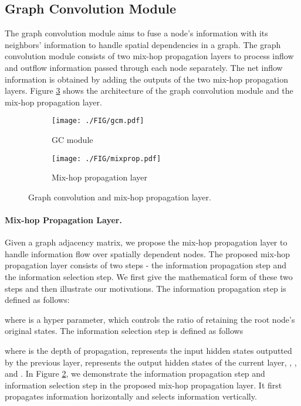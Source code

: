 \documentclass[sigconf]{acmart}
\begin{document}
\subsection{Graph Convolution Module}
The graph convolution module aims to fuse a node's information with its neighbors' information to handle spatial dependencies in a graph. The graph convolution module consists of two mix-hop propagation layers to process inflow and outflow information passed through each node separately. The net inflow information is obtained by adding the outputs of the two mix-hop propagation layers.  Figure \ref{fig:gc} shows the architecture of the graph convolution module and the mix-hop propagation layer. 
 \begin{figure}
        \centering
        \begin{subfigure}[b]{0.23\textwidth}
            \centering
            \texttt{[image: ./FIG/gcm.pdf]}
            \caption[GC module]{{\small GC module}}    
            \label{fig:gcm}
        \end{subfigure}
        \hfill
        \begin{subfigure}[b]{0.23\textwidth}  
            \centering 
            \texttt{[image: ./FIG/mixprop.pdf]}
            \caption[]{{\small Mix-hop propagation layer}}    
            \label{fig:mixprop}
        \end{subfigure}
        \caption[Graph convolution module and mix-hop propagation layer]
        {\small Graph convolution and mix-hop propagation layer.} 
        \label{fig:gc}
\end{figure}


\paragraph{Mix-hop Propagation Layer.}
Given a graph adjacency matrix, we propose the mix-hop propagation layer to handle information flow over spatially dependent nodes. The proposed mix-hop propagation layer consists of two steps - the information propagation step and the information selection step. We first give the mathematical form of these two steps and then illustrate our motivations. The information propagation step is defined as follows:

where  is a hyper parameter, which controls the ratio of retaining the root node's original states. The information selection step is defined as follows

where  is the depth of propagation,  represents the input hidden states outputted by the previous layer,  represents the output hidden states of the current layer, , , and .
In Figure \ref{fig:mixprop}, we demonstrate the information propagation step and information selection step in the proposed mix-hop propagation layer. It first propagates information horizontally and selects information vertically.
\end{document}
